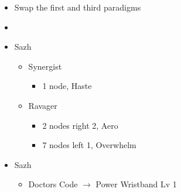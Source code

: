 \begin{multicols}{2}



\begin{menu}
\begin{itemize}
    \paradigm
    \begin{itemize}
        \item Swap the first and third paradigms
        \item {}%
{\paradigmline[1]{\textit{\syn}}{\textit{\sab}}{}}%
{\paradigmline{\com}{\med}{}}%
{\paradigmline{\com}{\rav}{}}%
{\paradigmline{\rav}{\rav}{}}%
{\paradigmline{[\rav]}{(\sab)}{}}%
{\paradigmline{[\com]}{(\sab)}{}}
    \end{itemize}
    \crystarium
    \begin{itemize}
        \item Sazh
        \begin{itemize}
            \item Synergist
            \begin{itemize}
                \item 1 node, Haste
            \end{itemize}
            \item Ravager
            \begin{itemize}
                \item 2 nodes right 2, Aero
                \item 7 nodes left 1, Overwhelm
            \end{itemize}
        \end{itemize}
    \end{itemize}
    \equip
    \begin{itemize}
        \item Sazh
        \begin{itemize}
                \item Doctors Code $\rightarrow$ Power Wristband Lv 1
        \end{itemize}
    \end{itemize}
\end{itemize}
\end{menu}

\renewcommand{\first}{[1] Tide Turner (\syn/\sab)}
\renewcommand{\second}{[2] War and Peace (\com/\med)}
\renewcommand{\third}{[3] Slash \& Burn (\com/\rav)}
\renewcommand{\fourth}{[4] Dualcasting (\rav/\rav)}
\renewcommand{\fifth}{[5] Undermine (\rav/\sab)}
\renewcommand{\sixth}{[6] Divide \& Conquer (\com/\sab)}


\end{multicols}

